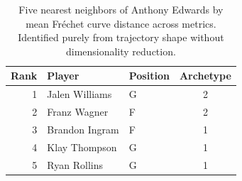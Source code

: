 \begin{table}[htbp]
  \centering\small
  \begin{tabular}{rllc}
    \toprule
    Rank & Player & Position & Archetype \\
    \midrule
    1 & Jalen Williams & G & 2 \\
    2 & Franz Wagner & F & 2 \\
    3 & Brandon Ingram & F & 1 \\
    4 & Klay Thompson & G & 1 \\
    5 & Ryan Rollins & G & 1 \\
    \bottomrule
  \end{tabular}
  \caption{Five nearest neighbors of Anthony Edwards by mean Fr\'{e}chet curve distance across metrics. Identified purely from trajectory shape without dimensionality reduction.}
  \label{tab:Anthony_Edwards_frechet_curve_neighbors}
\end{table}


